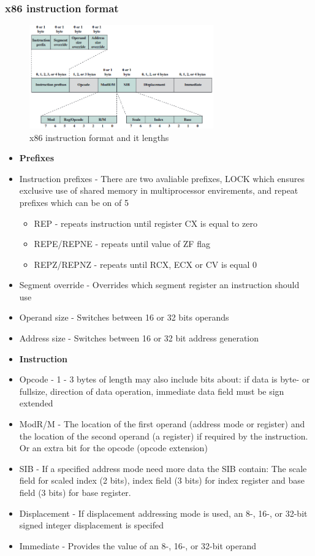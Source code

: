 \documentclass[12pt, a4paper]{article}
\begin{document}
			\subsubsection{x86 instruction format}
				\begin{figure}[h!]
					\centering
					\includegraphics[width=300px]{assets/x86instructionFormat.png}
					\caption{x86 instruction format and it lengths}
				\end{figure}
				\begin{itemize}
					\item \textbf{Prefixes}
					\item Instruction prefixes - There are two avaliable prefixes, LOCK which ensures exclusive use of shared memory in multiprocessor envirements, and repeat prefixes which can be on of 5
					\begin{itemize}
						\item REP - repeats instruction until register CX is equal to zero
						\item REPE/REPNE - repeats until value of ZF flag
						\item REPZ/REPNZ - repeats until RCX, ECX or CV is equal 0
					\end{itemize}
					\item  Segment override - Overrides which segment register an instruction should use
					\item Operand size - Switches between 16 or 32 bits operands
					\item Address size - Switches between 16 or 32 bit address generation
					\item \textbf{Instruction}
					\item Opcode - 1 - 3 bytes of length may also include bits about: if data is byte- or fullsize, direction of data operation, immediate data field must be sign extended
					\item ModR/M - The location of the first operand (address mode or register) and the location of the second operand (a register) if required by the instruction. Or an extra bit for the opcode (opcode extension)
					\item SIB - If a specified address mode need more data the SIB contain: The scale field for scaled index (2 bits), index field (3 bits) for index register and base field (3 bits) for base register.
					\item Displacement - If displacement addressing mode is used, an 8-, 16-, or 32-bit signed integer displacement is specifed
					\item Immediate - Provides the value of an 8-, 16-, or 32-bit operand
				\end{itemize} 
\end{document}
